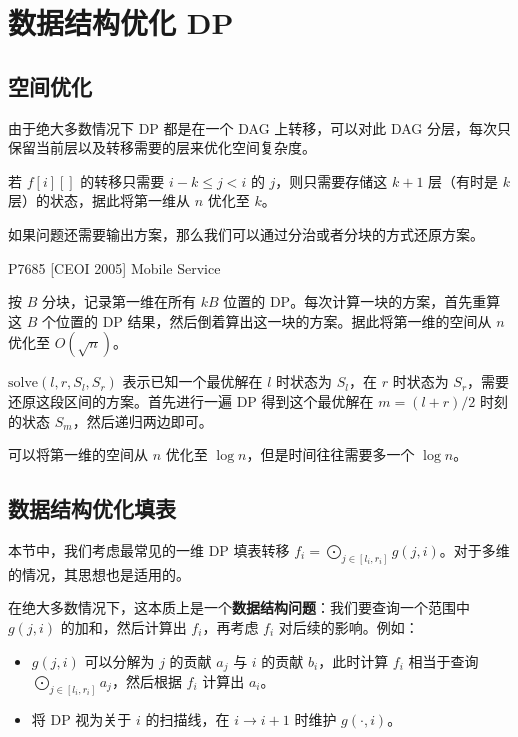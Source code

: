 \chapter{数据结构优化 DP}

\section{空间优化}

由于绝大多数情况下 DP 都是在一个 DAG 上转移，可以对此 DAG 分层，每次只保留当前层以及转移需要的层来优化空间复杂度。

\begin{example}[滚动数组]
    若 $f[i][]$ 的转移只需要 $i-k\le j<i$ 的 $j$，则只需要存储这 $k+1$ 层（有时是 $k$ 层）的状态，据此将第一维从 $n$ 优化至 $k$。
\end{example}

如果问题还需要输出方案，那么我们可以通过分治或者分块的方式还原方案。

\begin{example}[滚动数组输出方案]
    P7685 [CEOI 2005] Mobile Service
\end{example}
\begin{solution}[分块]
    按 $B$ 分块，记录第一维在所有 $kB$ 位置的 DP。每次计算一块的方案，首先重算这 $B$ 个位置的 DP 结果，然后倒着算出这一块的方案。据此将第一维的空间从 $n$ 优化至 $O(\sqrt{n})$。
\end{solution}
\begin{solution}[分治]
    $\mathrm{solve}(l,r,S_l,S_r)$ 表示已知一个最优解在 $l$ 时状态为 $S_l$，在 $r$ 时状态为 $S_r$，需要还原这段区间的方案。首先进行一遍 DP 得到这个最优解在 $m=(l+r)/2$ 时刻的状态 $S_m$，然后递归两边即可。
    
    可以将第一维的空间从 $n$ 优化至 $\log n$，但是时间往往需要多一个 $\log n$。
\end{solution}




\section{数据结构优化填表}

本节中，我们考虑最常见的一维 DP 填表转移 $f_i=\bigodot_{j\in [l_i,r_i]} g(j,i)$。对于多维的情况，其思想也是适用的。

在绝大多数情况下，这本质上是一个\textbf{数据结构问题}：我们要查询一个范围中 $g(j,i)$ 的加和，然后计算出 $f_i$，再考虑 $f_i$ 对后续的影响。例如：
\begin{itemize}
    \item $g(j,i)$ 可以分解为 $j$ 的贡献 $a_j$ 与 $i$ 的贡献 $b_i$，此时计算 $f_i$ 相当于查询 $\bigodot_{j\in [l_i,r_i]} a_j$，然后根据 $f_i$ 计算出 $a_i$。
    \item 将 DP 视为关于 $i$ 的扫描线，在 $i\to i+1$ 时维护 $g(\cdot,i)$。
\end{itemize}

